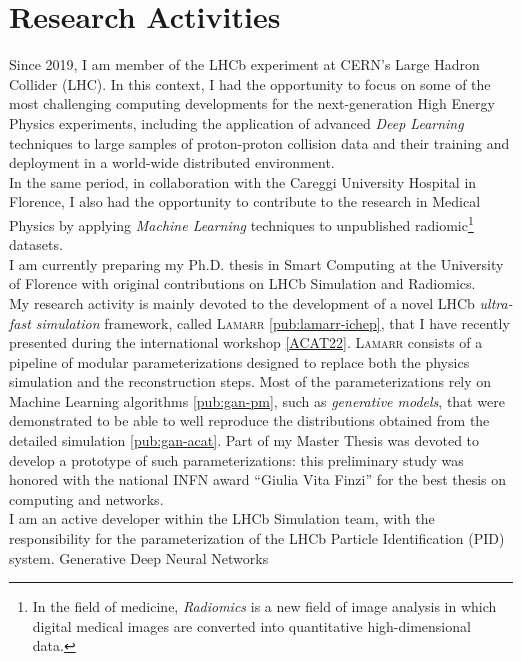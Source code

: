 \section*{Research Activities}
\begin{cvcontent}
  \onehalfspacing
  Since 2019, I am member of the LHCb experiment at CERN's Large 
  Hadron Collider (LHC). In this context, I had the opportunity to 
  focus on some of the most challenging computing developments for 
  the next-generation High Energy Physics experiments, including the 
  application of advanced \emph{Deep Learning} techniques to large 
  samples of proton-proton collision data and their training and 
  deployment in a world-wide distributed environment.
  \\
  In the same period, in collaboration with the Careggi University 
  Hospital in Florence, 
  I also had the opportunity to contribute to the research in Medical 
  Physics by applying \emph{Machine Learning} techniques to unpublished 
  radiomic\footnote{In the field of medicine, \emph{Radiomics} is a new 
  field of image analysis in which digital medical images are converted 
  into quantitative high-dimensional data.} datasets.
  \\
  I am currently preparing my Ph.D. thesis in Smart Computing at 
  the University of Florence with original contributions on 
  LHCb Simulation and Radiomics.
  \\ [2mm]
  My research activity is mainly devoted to the development of a novel 
  LHCb \emph{ultra-fast simulation} framework, called \textsc{Lamarr}
  \ref{pub:lamarr-ichep}, that I have recently presented during the 
  international workshop \hyperlink{acat-2022}{[ACAT22]}. \textsc{Lamarr} 
  consists of a pipeline of modular parameterizations designed to replace 
  both the physics simulation and the reconstruction steps. Most of the 
  parameterizations rely on Machine Learning algorithms \ref{pub:gan-pm},
  such as \emph{generative models}, that were demonstrated to be 
  able to well reproduce the distributions obtained from the 
  detailed simulation \ref{pub:gan-acat}. Part of my Master Thesis
  was devoted to develop a prototype of such parameterizations: this
  preliminary study was honored with the national INFN award
  ``Giulia Vita Finzi'' for the best thesis on computing and networks.
  \\ [2mm]
  I am an active developer within the LHCb Simulation team, with
  the responsibility for the parameterization of the LHCb Particle 
  Identification (PID) system. Generative Deep Neural Networks

\end{cvcontent}
